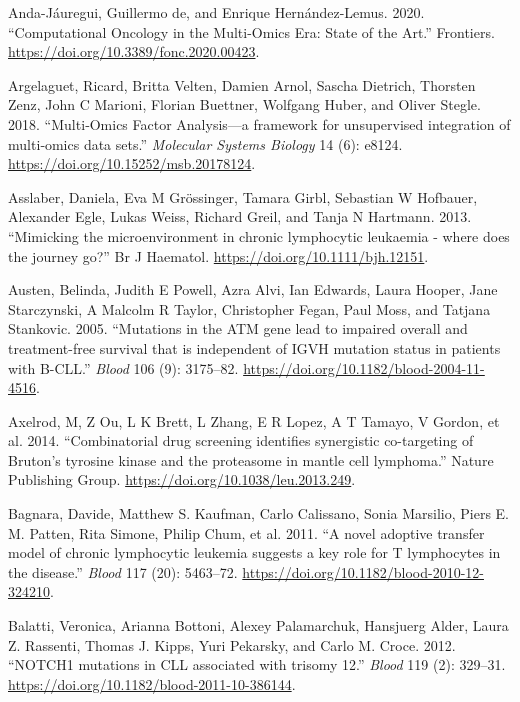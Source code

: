 \documentclass[11pt, a4paper, twosided]{book}
\newenvironment{CSLReferences}%
  {}%
  {\par}
\begin{document}
\begin{CSLReferences}{1}{0}
\leavevmode{}%
Anda-Jáuregui, Guillermo de, and Enrique Hernández-Lemus. 2020. {``{Computational Oncology in the Multi-Omics Era: State of the Art}.''} Frontiers. \url{https://doi.org/10.3389/fonc.2020.00423}.

\leavevmode{}%
Argelaguet, Ricard, Britta Velten, Damien Arnol, Sascha Dietrich, Thorsten Zenz, John C Marioni, Florian Buettner, Wolfgang Huber, and Oliver Stegle. 2018. {``{Multi‐Omics Factor Analysis---a framework for unsupervised integration of multi‐omics data sets}.''} \emph{Molecular Systems Biology} 14 (6): e8124. \url{https://doi.org/10.15252/msb.20178124}.

\leavevmode{}%
Asslaber, Daniela, Eva M Grössinger, Tamara Girbl, Sebastian W Hofbauer, Alexander Egle, Lukas Weiss, Richard Greil, and Tanja N Hartmann. 2013. {``{Mimicking the microenvironment in chronic lymphocytic leukaemia - where does the journey go?}''} Br J Haematol. \url{https://doi.org/10.1111/bjh.12151}.

\leavevmode{}%
Austen, Belinda, Judith E Powell, Azra Alvi, Ian Edwards, Laura Hooper, Jane Starczynski, A Malcolm R Taylor, Christopher Fegan, Paul Moss, and Tatjana Stankovic. 2005. {``{Mutations in the ATM gene lead to impaired overall and treatment-free survival that is independent of IGVH mutation status in patients with B-CLL}.''} \emph{Blood} 106 (9): 3175--82. \url{https://doi.org/10.1182/blood-2004-11-4516}.

\leavevmode{}%
Axelrod, M, Z Ou, L K Brett, L Zhang, E R Lopez, A T Tamayo, V Gordon, et al. 2014. {``{Combinatorial drug screening identifies synergistic co-targeting of Bruton's tyrosine kinase and the proteasome in mantle cell lymphoma}.''} Nature Publishing Group. \url{https://doi.org/10.1038/leu.2013.249}.

\leavevmode{}%
Bagnara, Davide, Matthew S. Kaufman, Carlo Calissano, Sonia Marsilio, Piers E. M. Patten, Rita Simone, Philip Chum, et al. 2011. {``{A novel adoptive transfer model of chronic lymphocytic leukemia suggests a key role for T lymphocytes in the disease}.''} \emph{Blood} 117 (20): 5463--72. \url{https://doi.org/10.1182/blood-2010-12-324210}.

\leavevmode{}%
Balatti, Veronica, Arianna Bottoni, Alexey Palamarchuk, Hansjuerg Alder, Laura Z. Rassenti, Thomas J. Kipps, Yuri Pekarsky, and Carlo M. Croce. 2012. {``{NOTCH1 mutations in CLL associated with trisomy 12}.''} \emph{Blood} 119 (2): 329--31. \url{https://doi.org/10.1182/blood-2011-10-386144}.


\end{CSLReferences}
\end{document}
